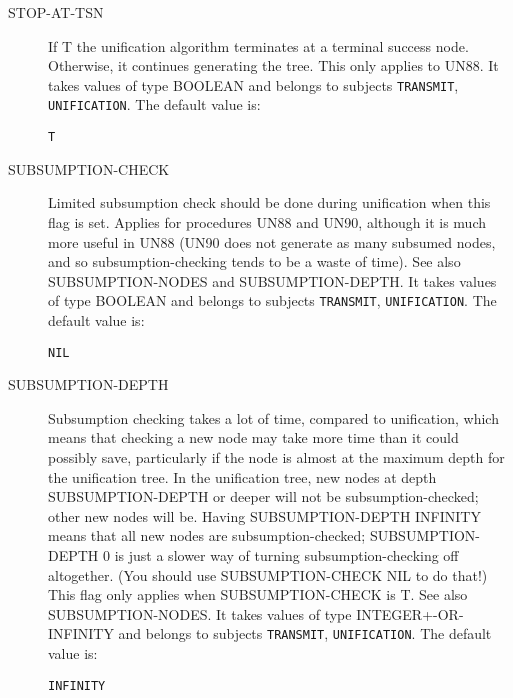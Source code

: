 \begin{description}
\item[STOP-AT-TSN]  
If T the unification algorithm terminates at a terminal success 
node. Otherwise, it continues generating the tree.
This only applies to UN88.
It takes values of type BOOLEAN and belongs to subjects \texttt{TRANSMIT}, \texttt{UNIFICATION}.  The default value is: \begin{lstlisting}
T
\end{lstlisting}

\item[SUBSUMPTION-CHECK]  
Limited subsumption check should be done during unification when
this flag is set. Applies for procedures UN88 and UN90, although it is
much more useful in UN88 (UN90 does not generate as many subsumed nodes,
and so subsumption-checking tends to be a waste of time). 
See also SUBSUMPTION-NODES and SUBSUMPTION-DEPTH.
It takes values of type BOOLEAN and belongs to subjects \texttt{TRANSMIT}, \texttt{UNIFICATION}.  The default value is: \begin{lstlisting}
NIL
\end{lstlisting}

\item[SUBSUMPTION-DEPTH]  
Subsumption checking takes a lot of time, compared 
to unification, which means that checking a new node may
take more time than it could possibly save, particularly
if the node is almost at the maximum depth for the 
unification tree.
In the unification tree, new nodes at depth SUBSUMPTION-DEPTH
or deeper will not be subsumption-checked; other new nodes
will be. Having SUBSUMPTION-DEPTH INFINITY means that all new 
nodes are subsumption-checked; SUBSUMPTION-DEPTH 0 is just
a slower way of turning subsumption-checking off altogether.
(You should use SUBSUMPTION-CHECK NIL to do that!)
This flag only applies when SUBSUMPTION-CHECK is T.
See also SUBSUMPTION-NODES.
It takes values of type INTEGER+-OR-INFINITY and belongs to subjects \texttt{TRANSMIT}, \texttt{UNIFICATION}.  The default value is: \begin{lstlisting}
INFINITY
\end{lstlisting}


\end{description}
